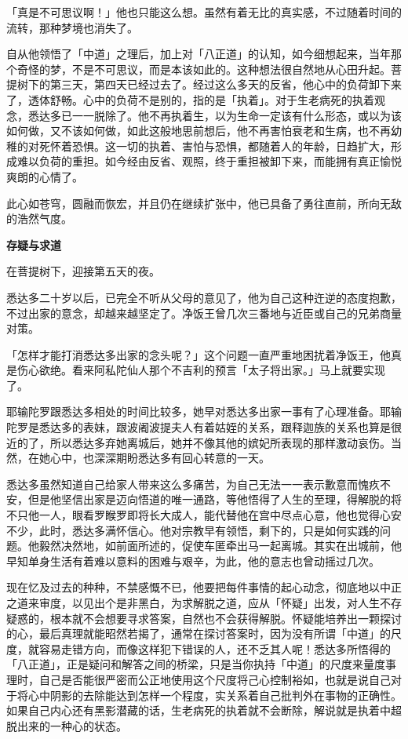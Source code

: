 \documentclass[twoside,openany]{book}
\newcommand{\mt}[1]{\textbullet \textbf{#1}}
\begin{document}
「真是不可思议啊！」他也只能这么想。虽然有着无比的真实感，不过随着时间的流转，那种梦境也消失了。

自从他领悟了「中道」之理后，加上对「八正道」的认知，如今细想起来，当年那个奇怪的梦，不是不可思议，而是本该如此的。这种想法很自然地从心田升起。菩提树下的第三天，第四天已经过去了。经过这么多天的反省，他心中的负荷卸下来了，透体舒畅。心中的负荷不是别的，指的是「执着」。对于生老病死的执着观念，悉达多已一一脱除了。他不再执着生，以为生命一定该有什么形态，或以为该如何做，又不该如何做，如此这般地思前想后，他不再害怕衰老和生病，也不再幼稚的对死怀着恐惧。这一切的执着、害怕与恐惧，都随着人的年龄，日趋扩大，形成难以负荷的重担。如今经由反省、观照，终于重担被卸下来，而能拥有真正愉悦爽朗的心情了。

此心如苍穹，圆融而恢宏，并且仍在继续扩张中，他已具备了勇往直前，所向无敌的浩然气度。

\mt{存疑与求道}

在菩提树下，迎接第五天的夜。

悉达多二十岁以后，已完全不听从父母的意见了，他为自己这种迕逆的态度抱歉，不过出家的意念，却越来越坚定了。净饭王曾几次三番地与近臣或自己的兄弟商量对策。

「怎样才能打消悉达多出家的念头呢？」这个问题一直严重地困扰着净饭王，他真是伤心欲绝。看来阿私陀仙人那个不吉利的预言「太子将出家。」马上就要实现了。

耶输陀罗跟悉达多相处的时间比较多，她早对悉达多出家一事有了心理准备。耶输陀罗是悉达多的表妹，跟波阇波提夫人有着姑姪的关系，跟释迦族的关系也算是很近的了，所以悉达多弃她离城后，她并不像其他的嫔妃所表现的那样激动哀伤。当然，在她心中，也深深期盼悉达多有回心转意的一天。

悉达多虽然知道自己给家人带来这么多痛苦，为自己无法一一表示歉意而愧疚不安，但是他坚信出家是迈向悟道的唯一通路，等他悟得了人生的至理，得解脱的将不只他一人，眼看罗睺罗即将长大成人，能代替他在宫中尽点心意，他也觉得心安不少，此时，悉达多满怀信心。他对宗教早有领悟，剩下的，只是如何实践的问题。他毅然决然地，如前面所述的，促使车匿牵出马一起离城。其实在出城前，他早知单身生活有着难以意料的困难与艰辛，为此，他的意志也曾动摇过几次。

现在忆及过去的种种，不禁感慨不已，他要把每件事情的起心动念，彻底地以中正之道来审度，以见出个是非黑白，为求解脱之道，应从「怀疑」出发，对人生不存疑惑的，根本就不会想要寻求答案，自然也不会获得解脱。怀疑能培养出一颗探讨的心，最后真理就能昭然若揭了，通常在探讨答案时，因为没有所谓「中道」的尺度，就容易走错方向，而像这样犯下错误的人，还不乏其人呢！悉达多所悟得的「八正道」，正是疑问和解答之间的桥梁，只是当你执持「中道」的尺度来量度事理时，自己是否能很严密而公正地使用这个尺度将己心控制裕如，也就是说自己对于将心中阴影的去除能达到怎样一个程度，实关系着自己批判外在事物的正确性。如果自己内心还有黑影潜藏的话，生老病死的执着就不会断除，解说就是执着中超脱出来的一种心的状态。
\end{document}
